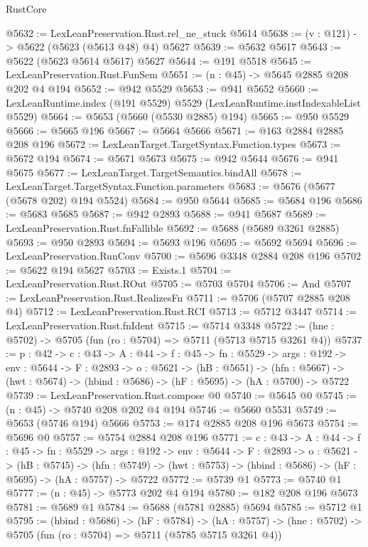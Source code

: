 \begin{lexlean}{RustCore}
\begin{coremodule}
@5632 := LexLeanPreservation.Rust.rel_ne_stuck @5614
@5638 := (v : @121) -> @5622 (@5623 (@5613 @48) @4) @5627
@5639 := @5632 @5617
@5643 := @5622 (@5623 @5614 @5617) @5627
@5644 := @191 @5518
@5645 := LexLeanPreservation.Rust.FunSem
@5651 := (n : @45) -> @5645 @2885 @208 @202 @4 @194
@5652 := @942 @5529
@5653 := @941 @5652
@5660 := LexLeanRuntime.index (@191 @5529) @5529 (LexLeanRuntime.instIndexableList @5529)
@5664 := @5653 (@5660 (@5530 @2885) @194)
@5665 := @950 @5529
@5666 := @5665 @196
@5667 := @5664 @5666
@5671 := @163 @2884 @2885 @208 @196
@5672 := LexLeanTarget.TargetSyntax.Function.types
@5673 := @5672 @194
@5674 := @5671 @5673
@5675 := @942 @5644
@5676 := @941 @5675
@5677 := LexLeanTarget.TargetSemantics.bindAll
@5678 := LexLeanTarget.TargetSyntax.Function.parameters
@5683 := @5676 (@5677 (@5678 @202) @194 @5524)
@5684 := @950 @5644
@5685 := @5684 @196
@5686 := @5683 @5685
@5687 := @942 @2893
@5688 := @941 @5687
@5689 := LexLeanPreservation.Rust.fnFallible
@5692 := @5688 (@5689 @3261 @2885)
@5693 := @950 @2893
@5694 := @5693 @196
@5695 := @5692 @5694
@5696 := LexLeanPreservation.RunConv
@5700 := @5696 @3348 @2884 @208 @196
@5702 := @5622 @194 @5627
@5703 := Exists.{1}
@5704 := LexLeanPreservation.Rust.ROut
@5705 := @5703 @5704
@5706 := And
@5707 := LexLeanPreservation.Rust.RealizesFn
@5711 := @5706 (@5707 @2885 @208 @4)
@5712 := LexLeanPreservation.Rust.RCI
@5713 := @5712 @3447
@5714 := LexLeanPreservation.Rust.fnIdent
@5715 := @5714 @3348
@5722 := (hne : @5702) -> @5705 (fun (ro : @5704) => @5711 (@5713 @5715 @3261 @4))
@5737 := {p : @42} ->
  {c : @43} ->
  {A : @44} ->
  {f : @45} ->
  {fn : @5529} ->
  {args : @192} ->
  {env : @5644} ->
  {F : @2893} ->
  {o : @5621} ->
  (hB : @5651) ->
  (hfn : @5667) -> (hwt : @5674) -> (hbind : @5686) -> (hF : @5695) -> (hA : @5700) -> @5722
@5739 := LexLeanPreservation.Rust.compose @0
@5740 := @5645 @0
@5745 := (n : @45) -> @5740 @208 @202 @4 @194
@5746 := @5660 @5531
@5749 := @5653 (@5746 @194) @5666
@5753 := @174 @2885 @208 @196 @5673
@5754 := @5696 @0
@5757 := @5754 @2884 @208 @196
@5771 := {c : @43} ->
  {A : @44} ->
  {f : @45} ->
  {fn : @5529} ->
  {args : @192} ->
  {env : @5644} ->
  {F : @2893} ->
  {o : @5621} ->
  (hB : @5745) ->
  (hfn : @5749) -> (hwt : @5753) -> (hbind : @5686) -> (hF : @5695) -> (hA : @5757) -> @5722
@5772 := @5739 @1
@5773 := @5740 @1
@5777 := (n : @45) -> @5773 @202 @4 @194
@5780 := @182 @208 @196 @5673
@5781 := @5689 @1
@5784 := @5688 (@5781 @2885) @5694
@5785 := @5712 @1
@5795 := (hbind : @5686) ->
  (hF : @5784) ->
  (hA : @5757) -> (hne : @5702) -> @5705 (fun (ro : @5704) => @5711 (@5785 @5715 @3261 @4))

\end{coremodule}
\end{lexlean}
